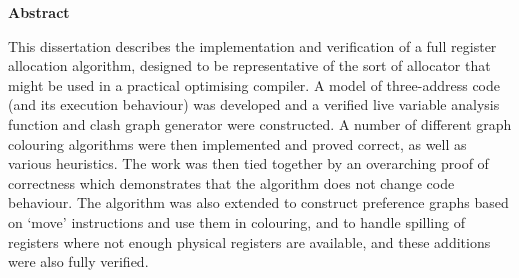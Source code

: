 \newpage
{\Huge \bf Abstract}
\vspace{24pt} 


This dissertation describes the implementation and verification of a full register allocation algorithm, designed to be representative of the sort of allocator that might be used in a practical optimising compiler. A model of three-address code (and its execution behaviour) was developed and a verified live variable analysis function and clash graph generator were constructed. A number of different graph colouring algorithms were then implemented and proved correct, as well as various heuristics. The work was then tied together by an overarching proof of correctness which demonstrates that the algorithm does not change code behaviour. The algorithm was also extended to construct preference graphs based on `move' instructions and use them in colouring, and to handle spilling of registers where not enough physical registers are available, and these additions were also fully verified.


\newpage
\vspace*{\fill}
